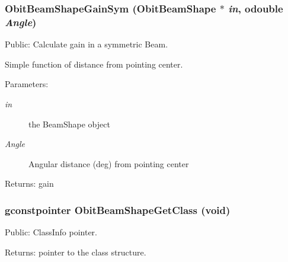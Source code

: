 \subsubsection{ Obit\-Beam\-Shape\-Gain\-Sym ({\bf Obit\-Beam\-Shape} $\ast$ {\em in}, {\bf odouble} {\em Angle})}\label{ObitBeamShape_8h_a14}


Public: Calculate gain in a symmetric Beam. 

Simple function of distance from pointing center. \begin{Desc}
\item[Parameters:]
\begin{description}
\item[{\em in}]the Beam\-Shape object \item[{\em Angle}]Angular distance (deg) from pointing center \end{description}
\end{Desc}
\begin{Desc}
\item[Returns:]gain \end{Desc}
\subsubsection{\setlength{\rightskip}{0pt plus 5cm}gconstpointer Obit\-Beam\-Shape\-Get\-Class (void)}\label{ObitBeamShape_8h_a10}


Public: Class\-Info pointer. 

\begin{Desc}
\item[Returns:]pointer to the class structure. \end{Desc}

